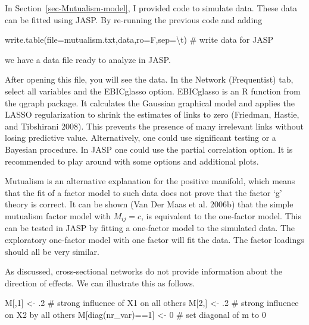 \documentclass[
  a4paper,
  DIV=11,
  numbers=noendperiod,
  oneside]{scrreprt}
\newenvironment{Shaded}{\begin{snugshade}}{\end{snugshade}}
\newcommand{\AttributeTok}[1]{\textcolor[rgb]{0.40,0.45,0.13}{#1}}
\newcommand{\CommentTok}[1]{\textcolor[rgb]{0.37,0.37,0.37}{#1}}
\newcommand{\DecValTok}[1]{\textcolor[rgb]{0.68,0.00,0.00}{#1}}
\newcommand{\FunctionTok}[1]{\textcolor[rgb]{0.28,0.35,0.67}{#1}}
\newcommand{\NormalTok}[1]{\textcolor[rgb]{0.00,0.23,0.31}{#1}}
\newcommand{\OtherTok}[1]{\textcolor[rgb]{0.00,0.23,0.31}{#1}}
\newcommand{\SpecialCharTok}[1]{\textcolor[rgb]{0.37,0.37,0.37}{#1}}
\newcommand{\StringTok}[1]{\textcolor[rgb]{0.13,0.47,0.30}{#1}}
\begin{document}
In Section~\ref{sec-Mutualism-model}, I provided code to simulate data.
These data can be fitted using JASP. By re-running the previous code and
adding

\begin{Shaded}
\begin{Highlighting}[]
\FunctionTok{write.table}\NormalTok{(}\AttributeTok{file=}\StringTok{\textquotesingle{}mutualism.txt\textquotesingle{}}\NormalTok{,data,}\AttributeTok{ro=}\NormalTok{F,}\AttributeTok{sep=}\StringTok{\textquotesingle{}}\SpecialCharTok{\textbackslash{}t}\StringTok{\textquotesingle{}}\NormalTok{) }\CommentTok{\# write data for JASP}
\end{Highlighting}
\end{Shaded}

we have a data file ready to analyze in JASP.

After opening this file, you will see the data. In the Network
(Frequentist) tab, select all variables and the EBICglasso option.
EBICglasso is an R function from the qgraph package. It calculates the
Gaussian graphical model and applies the LASSO regularization to shrink
the estimates of links to zero (Friedman, Hastie, and Tibshirani 2008).
This prevents the presence of many irrelevant links without losing
predictive value. Alternatively, one could use significant testing or a
Bayesian procedure. In JASP one could use the partial correlation
option. It is recommended to play around with some options and
additional plots.

Mutualism is an alternative explanation for the positive manifold, which
means that the fit of a factor model to such data does not prove that
the factor `g' theory is correct. It can be shown (Van Der Maas et al.
2006b) that the simple mutualism factor model with \(M_{ij} = c\), is
equivalent to the one-factor model. This can be tested in JASP by
fitting a one-factor model to the simulated data. The exploratory
one-factor model with one factor will fit the data. The factor loadings
should all be very similar.

As discussed, cross-sectional networks do not provide information about
the direction of effects. We can illustrate this as follows.

\begin{Shaded}
\begin{Highlighting}[]
\NormalTok{M[,}\DecValTok{1}\NormalTok{] }\OtherTok{\textless{}{-}}\NormalTok{ .}\DecValTok{2} \CommentTok{\# strong influence of X1 on all others}
\NormalTok{M[}\DecValTok{2}\NormalTok{,] }\OtherTok{\textless{}{-}}\NormalTok{ .}\DecValTok{2} \CommentTok{\# strong influence on X2 by all others}
\NormalTok{M[}\FunctionTok{diag}\NormalTok{(nr\_var)}\SpecialCharTok{==}\DecValTok{1}\NormalTok{] }\OtherTok{\textless{}{-}} \DecValTok{0} \CommentTok{\# set diagonal of m to 0}
\end{Highlighting}
\end{Shaded}
\end{document}
